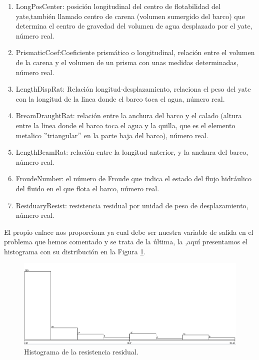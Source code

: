 \documentclass[a4paper, 11pt, twoside, openany, onecolumn, final]{memoir}
\begin{document}
	\begin{enumerate}
\item LongPosCenter: posición longitudinal del centro de flotabilidad del yate,también llamado centro de carena (volumen sumergido del barco) que determina el centro de gravedad del volumen de agua desplazado por el yate, número real.
\item PrismaticCoef:Coeficiente prismático o longitudinal, relación entre el volumen de la carena y el volumen de un prisma con unas medidas determinadas, número real.
\item LengthDispRat: Relación longitud-desplazamiento, relaciona el peso del yate con la longitud de la linea donde el barco toca el agua, número real.
\item BreamDraughtRat: relación entre la anchura del barco y el calado (altura entre la linea donde el barco toca el agua y la quilla, que es el elemento metalico ''triangular$"$ en la parte baja del barco), número real.
\item LengthBeamRat: relación entre la longitud anterior, y la anchura del barco, número real.
\item FroudeNumber: el número de Froude que indica el estado del flujo hidráulico del fluido en el que flota el barco, número real.
\item ResiduaryResist: resistencia residual por unidad de peso de desplazamiento, número real.
\end{enumerate}

	El propio enlace nos proporciona ya cual debe ser nuestra variable de salida en el problema que hemos comentado y se trata de la última, la ,aquí presentamos el histograma con su distribución en la Figura \ref{HistoVarSalidaRegre}.
	
	\begin{figure}
  		\centering
   	\includegraphics[width=1\textwidth]{Imagenes/HistogramaVarSalidaRegre}
  		\caption{Histograma de la resistencia residual.}
  		\label{HistoVarSalidaRegre}
	\end{figure}
\end{document}
